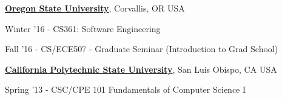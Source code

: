 \documentclass[10pt]{article}
\begin{document}
\begin{outerlist}


\item[]\href{http://www.oregonstate.edu/}{\textbf{Oregon State University}},
Corvallis, OR USA
             \begin{innerlist}
             \item Winter '16 - CS361: Software Engineering
             \item Fall '16 - CS/ECE507 - Graduate Seminar (Introduction to Grad School)
\end{innerlist}

\item[] \href{http://www.calpoly.edu/}{\textbf{California Polytechnic State University}},
San Luis Obispo, CA USA
             \begin{innerlist}
             \item Spring '13 - CSC/CPE 101 Fundamentals of Computer Science I  
\end{innerlist}
\end{outerlist}
\end{document}
